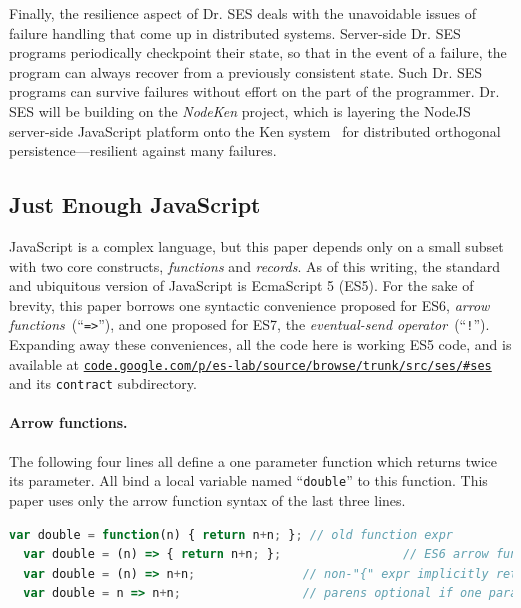 \documentclass{llncs}
\newcommand{\myurl}[1]{{\href{http://#1}{\texttt{#1}}}}
\begin{document}
Finally, the resilience aspect of Dr. SES deals with the unavoidable issues of failure handling that come up in distributed systems. 
Server-side Dr. SES programs periodically checkpoint their state, so that in the event of a failure, the program can always recover from a previously consistent state. Such Dr. SES programs can survive failures without effort on the part of the programmer. Dr. SES will be building on the \emph{NodeKen} project, which is layering the NodeJS server-side JavaScript platform onto the Ken system~\cite{Yoo:CKen} for distributed orthogonal persistence---resilient against many failures.



\subsection{Just Enough JavaScript}
\label{enoughjs}

JavaScript is a complex language, but this paper depends only on a small subset with two core constructs, \emph{functions} and \emph{records}. As of this writing, the standard and ubiquitous version of JavaScript is EcmaScript 5 (ES5). For the sake of brevity, this paper borrows one syntactic convenience proposed for ES6, \emph{arrow functions}~(``{\tt =>}''), and one proposed for ES7, the \emph{eventual-send operator}~(``{\tt !}''). Expanding away these conveniences, all the code here is working ES5 code, and is available at \myurl{code.google.com/p/es-lab/source/browse/trunk/src/ses/\#ses} and its {\tt contract} subdirectory.

\paragraph{Arrow functions.} 

The following four lines all define a one parameter function which returns twice its parameter. All bind a local variable named ``{\tt double}'' to this function. This paper uses only the arrow function syntax of the last three lines.

\begin{lstlisting}[language=JavaScript,numbers=none]
  var double = function(n) { return n+n; }; // old function expr
  var double = (n) => { return n+n; };                 // ES6 arrow function
  var double = (n) => n+n;               // non-"{" expr implicitly returned
  var double = n => n+n;                 // parens optional if one param
\end{lstlisting}
\end{document}
